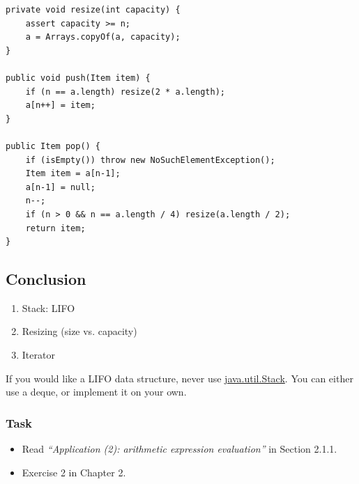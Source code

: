 \documentclass[aspectratio=169, 14pt]{beamer}
\begin{document}
\begin{frame}[fragile]
    \begin{verbatim}
private void resize(int capacity) {
    assert capacity >= n;
    a = Arrays.copyOf(a, capacity);
}

public void push(Item item) {
    if (n == a.length) resize(2 * a.length);
    a[n++] = item;
}

public Item pop() {
    if (isEmpty()) throw new NoSuchElementException();
    Item item = a[n-1];
    a[n-1] = null;
    n--;
    if (n > 0 && n == a.length / 4) resize(a.length / 2);
    return item;
}
    \end{verbatim}
\end{frame}

\begin{frame}
\section{\textcolor{darkmidnightblue}{Conclusion}}
    \begin{enumerate}
        \item Stack: LIFO
        \item Resizing (size vs. capacity)
        \item Iterator
    \end{enumerate}
\end{frame}

{
\begin{frame}[standout]
  If you would like a LIFO data structure, never use \href{https://docs.oracle.com/en/java/javase/11/docs/api/java.base/java/util/Stack.html}{java.util.Stack}. You can either use a \alert{deque}, or implement it on your own.
\end{frame}
}

\begin{frame}
    \frametitle{Task}
    \begin{itemize}
        \item  Read \emph{``Application (2): arithmetic expression evaluation''} in Section 2.1.1.
        \item Exercise 2 in Chapter 2.
    \end{itemize}

\end{frame}
\end{document}

